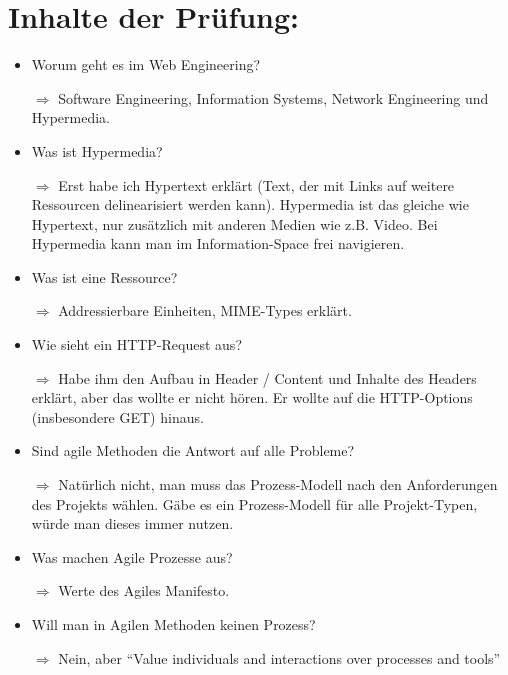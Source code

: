 \documentclass[a4paper]{article}
\begin{document}
\section*{Inhalte der Prüfung:}


    \begin{itemize}
        \item Worum geht es im Web Engineering?
        \item[$\Rightarrow$] Software Engineering, Information Systems, Network Engineering und Hypermedia.
        \item Was ist Hypermedia?
        \item[$\Rightarrow$] Erst habe ich Hypertext erklärt (Text, der mit Links auf weitere Ressourcen delinearisiert werden kann).
             Hypermedia ist das gleiche wie Hypertext, nur zusätzlich mit anderen Medien wie z.B. Video. 
             Bei Hypermedia kann man im Information-Space frei navigieren.
        \item Was ist eine Ressource?
        \item[$\Rightarrow$] Addressierbare Einheiten, MIME-Types erklärt.
        \item Wie sieht ein HTTP-Request aus?
        \item[$\Rightarrow$] Habe ihm den Aufbau in Header / Content und Inhalte des
              Headers erklärt, aber das wollte er nicht hören. Er
              wollte auf die HTTP-Options (insbesondere GET) hinaus.
        \item Sind agile Methoden die Antwort auf alle Probleme?
        \item[$\Rightarrow$] Natürlich nicht, man muss das Prozess-Modell 
              nach den Anforderungen des Projekts wählen. Gäbe es ein
              Prozess-Modell für alle Projekt-Typen, würde man dieses
              immer nutzen.
        \item Was machen Agile Prozesse aus?
        \item[$\Rightarrow$] Werte des Agiles Manifesto.
        \item Will man in Agilen Methoden keinen Prozess?
        \item[$\Rightarrow$] Nein, aber "`Value individuals and interactions over processes and tools"'
    \end{itemize}
\end{document}
